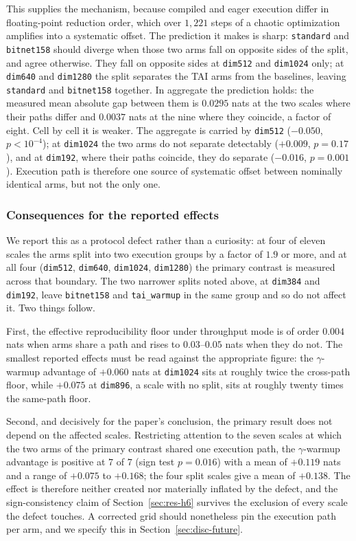 \documentclass[final,5p,times,twocolumn]{elsarticle}
\theoremstyle{remark}
\begin{document}
This supplies the mechanism, because compiled and eager execution differ in
floating-point reduction order, which over $1{,}221$ steps of a chaotic
optimization amplifies into a systematic offset. The prediction it makes is
sharp: \texttt{standard} and \texttt{bitnet158} should diverge when those two
arms fall on opposite sides of the split, and agree otherwise. They fall on
opposite sides at \texttt{dim512} and
\texttt{dim1024} only; at \texttt{dim640} and \texttt{dim1280} the split
separates the TAI arms from the baselines, leaving \texttt{standard} and
\texttt{bitnet158} together. In aggregate the prediction holds: the measured
mean absolute gap between them is
$0.0295$ nats at the two scales where their paths differ and $0.0037$ nats at
the nine where they coincide, a factor of eight. Cell by cell it is weaker.
The aggregate is carried by \texttt{dim512} ($-0.050$, $p < 10^{-4}$); at
\texttt{dim1024} the two arms do not separate detectably ($+0.009$,
$p = 0.17$), and at \texttt{dim192}, where their paths coincide, they do
separate ($-0.016$, $p = 0.001$). Execution path is therefore one source of
systematic offset between nominally identical arms, but not the only one.

\subsubsection{Consequences for the reported effects}

We report this as a protocol defect rather than a curiosity: at four of eleven
scales the arms split into two execution groups by a factor of $1.9$ or more,
and at all four (\texttt{dim512}, \texttt{dim640}, \texttt{dim1024},
\texttt{dim1280}) the primary contrast is measured across that boundary. The
two narrower splits noted above, at \texttt{dim384} and \texttt{dim192}, leave
\texttt{bitnet158} and \texttt{tai\_warmup} in the same group and so do not
affect it. Two things follow.

First, the effective reproducibility floor under throughput mode is of order
$0.004$ nats when arms share a path and rises to $0.03$--$0.05$ nats when they
do not. The smallest reported effects must be read against the appropriate
figure: the $\gamma$-warmup advantage of $+0.060$ nats at \texttt{dim1024} sits
at roughly twice the cross-path floor, while $+0.075$ at \texttt{dim896}, a
scale with no split, sits at roughly twenty times the same-path floor.

Second, and decisively for the paper's conclusion, the primary result does not
depend on the affected scales. Restricting attention to the seven scales at
which the two arms of the primary contrast shared one execution path, the
$\gamma$-warmup advantage is
positive at $7$ of $7$ (sign test $p = 0.016$) with a mean of $+0.119$ nats and
a range of $+0.075$ to $+0.168$; the four split scales give a mean of $+0.138$.
The effect is therefore neither created nor materially inflated by the defect,
and the sign-consistency claim of Section~\ref{sec:res-h6} survives the
exclusion of every scale the defect touches. A corrected grid should nonetheless pin
the execution path per arm, and we specify this in
Section~\ref{sec:disc-future}.
\end{document}
